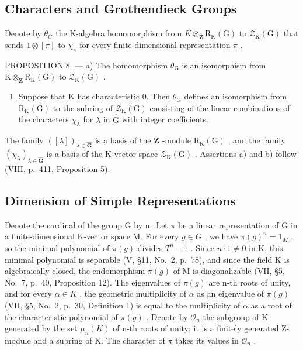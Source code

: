 \subsection{Characters and Grothendieck Groups}

Denote by \(\theta_{G}\) the K-algebra homomorphism from \(K\otimes_{\mathbf{Z}}\mathrm{R}_{\mathrm{K}}(\mathrm{G})\) to \(\mathcal{Z}_{\mathrm{K}}(\mathrm{G})\) that sends \(1\otimes[\pi]\) to \(\chi_{\pi}\) for every finite-dimensional representation \(\pi\) .

PROPOSITION 8. --- a) The homomorphism \(\theta_{\mathrm{G}}\) is an isomorphism from \(\mathrm{K} \otimes_{\mathbf{Z}} \mathrm{R}_{\mathrm{K}}(\mathrm{G})\) to \(\mathcal{Z}_{\mathrm{K}}(\mathrm{G})\) .

\begin{enumerate}
\def\labelenumi{\alph{enumi})}
\setcounter{enumi}{1}
\tightlist
\item
  Suppose that K has characteristic 0. Then \(\theta_{\mathrm{G}}\) defines an isomorphism from \(\mathrm{R}_{\mathrm{K}}(\mathrm{G})\) to the subring of \(\mathcal{Z}_{\mathrm{K}}(\mathrm{G})\) consisting of the linear combinations of the characters \(\chi_{\lambda}\) for \(\lambda\) in \(\widehat{\mathrm{G}}\) with integer coefficients.
\end{enumerate}

The family \(([\lambda])_{\lambda \in \widehat{\mathbf{G}}}\) is a basis of the \(\mathbf{Z}\) -module \(\mathrm{R}_{\mathrm{K}}(\mathrm{G})\) , and the family \((\chi_{\lambda})_{\lambda \in \widehat{\mathbf{G}}}\) is a basis of the K-vector space \(\mathcal{Z}_{\mathrm{K}}(\mathrm{G})\) . Assertions a) and b) follow (VIII, p.~411, Proposition 5).

\subsection{Dimension of Simple Representations}

Denote the cardinal of the group G by n.~Let \(\pi\) be a linear representation of G in a finite-dimensional K-vector space M. For every \(g \in G\) , we have \(\pi(g)^{n} = 1_{M}\) , so the minimal polynomial of \(\pi(g)\) divides \(T^{n} - 1\) . Since \(n \cdot 1 \neq 0\) in K, this minimal polynomial is separable (V, §11, No.~2, p.~78), and since the field K is algebraically closed, the endomorphism \(\pi(g)\) of M is diagonalizable (VII, §5, No.~7, p.~40, Proposition 12). The eigenvalues of \(\pi(g)\) are n-th roots of unity, and for every \(\alpha \in K\) , the geometric multiplicity of \(\alpha\) as an eigenvalue of \(\pi(g)\) (VII, §5, No.~2, p.~30, Definition 1) is equal to the multiplicity of \(\alpha\) as a root of the characteristic polynomial of \(\pi(g)\) . Denote by \(\mathcal{O}_{n}\) the subgroup of K generated by the set \(\mu_{n}(K)\) of n-th roots of unity; it is a finitely generated Z-module and a subring of K. The character of \(\pi\) takes its values in \(\mathcal{O}_{n}\) .

